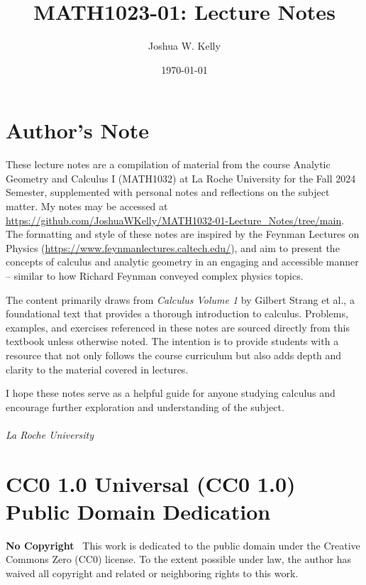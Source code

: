 \documentclass[12pt]{book}
\title{MATH1023-01: Lecture Notes} %
\author{Joshua W. Kelly} %
\date{\today} %
\begin{document}
\maketitle %

\section*{Author's Note} %
These lecture notes are a compilation of material from the course Analytic Geometry and Calculus I (MATH1032) at La Roche University for the Fall 2024 Semester, supplemented with personal notes and reflections on the subject matter. My notes may be accessed at \\ \url{https://github.com/JoshuaWKelly/MATH1032-01-Lecture_Notes/tree/main}. The formatting and style of these notes are inspired by the Feynman Lectures on Physics (\url{https://www.feynmanlectures.caltech.edu/}), and aim to present the concepts of calculus and analytic geometry in an engaging and accessible manner -- similar to how Richard Feynman conveyed complex physics topics.

The content primarily draws from \textit{Calculus Volume 1} by Gilbert Strang et al.\cite{strang_calculus_2016}, a foundational text that provides a thorough introduction to calculus. Problems, examples, and exercises referenced in these notes are sourced directly from this textbook unless otherwise noted. The intention is to provide students with a resource that not only follows the course curriculum but also adds depth and clarity to the material covered in lectures.

I hope these notes serve as a helpful guide for anyone studying calculus and encourage further exploration and understanding of the subject.\\

 \\
\textit{La Roche University} \\ 

\newpage

\vfill

\section*{CC0 1.0 Universal (CC0 1.0) Public Domain Dedication}

\textbf{No Copyright}  
\faCreativeCommons~This work is dedicated to the public domain under the Creative Commons Zero (CC0) license. To the extent possible under law, the author has waived all copyright and related or neighboring rights to this work. 
\end{document}
